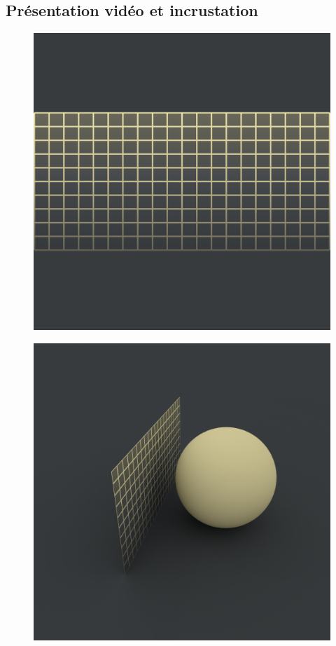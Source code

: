 			\lipsum[5]
			
		\subsection{Présentation vidéo et incrustation}
		
		\begin{figure}[htb]
			\centering
			\begin{minipage}{.5\textwidth}
				\centering
				\includegraphics[width=0.95\linewidth]{figures/def0.png}
				\label{fig:def0}
			\end{minipage}%
			\begin{minipage}{.5\textwidth}
				\centering
				\includegraphics[width=0.95\linewidth]{figures/def1.png}
				\label{fig:def1}
			\end{minipage}
			

\end{figure}
